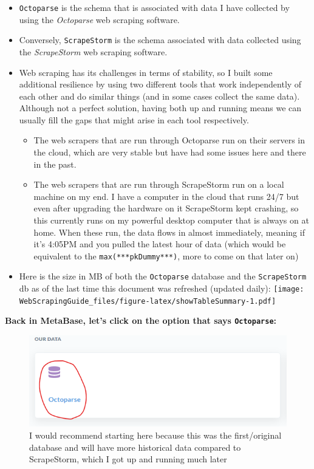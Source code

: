 \documentclass[]{book}
\begin{document}
\begin{itemize}
\item
  \texttt{Octoparse} is the schema that is associated with data I have collected by using the \emph{Octoparse} web scraping software.
\item
  Conversely, \texttt{ScrapeStorm} is the schema associated with data collected using the \emph{ScrapeStorm} web scraping software.
\item
  Web scraping has its challenges in terms of stability, so I built some additional resilience by using two different tools that work independently of each other and do similar things (and in some cases collect the same data). Although not a perfect solution, having both up and running means we can usually fill the gaps that might arise in each tool respectively.

  \begin{itemize}
  \item
    The web scrapers that are run through Octoparse run on their servers in the cloud, which are very stable but have had some issues here and there in the past.
  \item
    The web scrapers that are run through ScrapeStorm run on a local machine on my end. I have a computer in the cloud that runs 24/7 but even after upgrading the hardware on it ScrapeStorm kept crashing, so this currently runs on my powerful desktop computer that is always on at home. When these run, the data flows in almost immediately, meaning if it's 4:05PM and you pulled the latest hour of data (which would be equivalent to the \texttt{max(***pkDummy***)}, more to come on that later on)
  \end{itemize}
\item
  Here is the size in MB of both the \texttt{Octoparse} database and the \texttt{ScrapeStorm} db as of the last time this document was refreshed (updated daily):
  \texttt{[image: WebScrapingGuide\_files/figure-latex/showTableSummary-1.pdf]}
\end{itemize}

\textbf{Back in MetaBase, let's click on the option that says \texttt{Octoparse}:}

\begin{figure}
\centering
\includegraphics{images/OctoparseClick.png}
\caption{I would recommend starting here because this was the first/original database and will have more historical data compared to ScrapeStorm, which I got up and running much later}
\end{figure}
\end{document}
